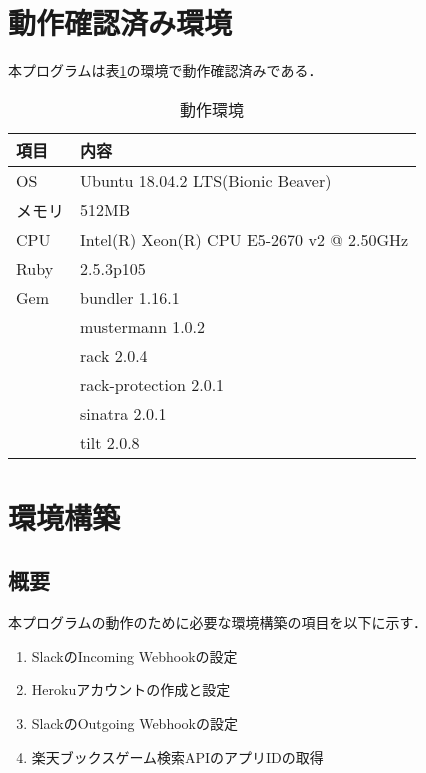 \documentclass[12pt]{jsarticle}
\begin{document}
\section{動作確認済み環境}\label{動作確認済み環境}
本プログラムは表\ref{tab:動作環境}の環境で動作確認済みである．
\begin{table}[tb]
  \begin{center}
    \caption{動作環境}\label{tab:動作環境}
    \begin{tabular}{l|l}
      \hline\hline
      項目 & 内容\\
      \hline
      OS & Ubuntu 18.04.2 LTS(Bionic Beaver)\\
      メモリ & 512MB\\
      CPU & Intel(R) Xeon(R) CPU E5-2670 v2 @ 2.50GHz\\
      Ruby & 2.5.3p105\\
      Gem & bundler 1.16.1\\
       & mustermann 1.0.2\\
       & rack 2.0.4\\
       & rack-protection 2.0.1\\
       & sinatra 2.0.1\\
       & tilt 2.0.8\\
      \hline
    \end{tabular}
  \end{center}
\end{table}

\section{環境構築}
\subsection{概要}
本プログラムの動作のために必要な環境構築の項目を以下に示す．
\begin{enumerate}
  \item SlackのIncoming Webhookの設定
  \item Herokuアカウントの作成と設定
  \item SlackのOutgoing Webhookの設定
  \item 楽天ブックスゲーム検索APIのアプリIDの取得
\end{enumerate}
\end{document}
